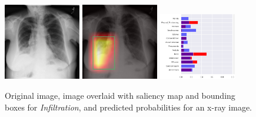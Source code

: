 \documentclass[12pt,oneside,a4paper]{report}
\begin{document}
\begin{figure}[H]
  \centering
  \includegraphics[width=0.3\textwidth]{images/preds/infiltration}\hspace{0.01\textwidth}%
  \includegraphics[width=0.3\textwidth]{images/preds/infiltration_cam}\hspace{0.01\textwidth}%
  \includegraphics[width=0.3\textwidth]{images/preds/infiltration_probs}\\[0.01\textwidth]
  \caption{Original image, image overlaid with saliency map and bounding boxes
    for \emph{Infiltration}, and predicted probabilities for an x-ray image.}
  \label{examples_4}
\end{figure}
\end{document}
